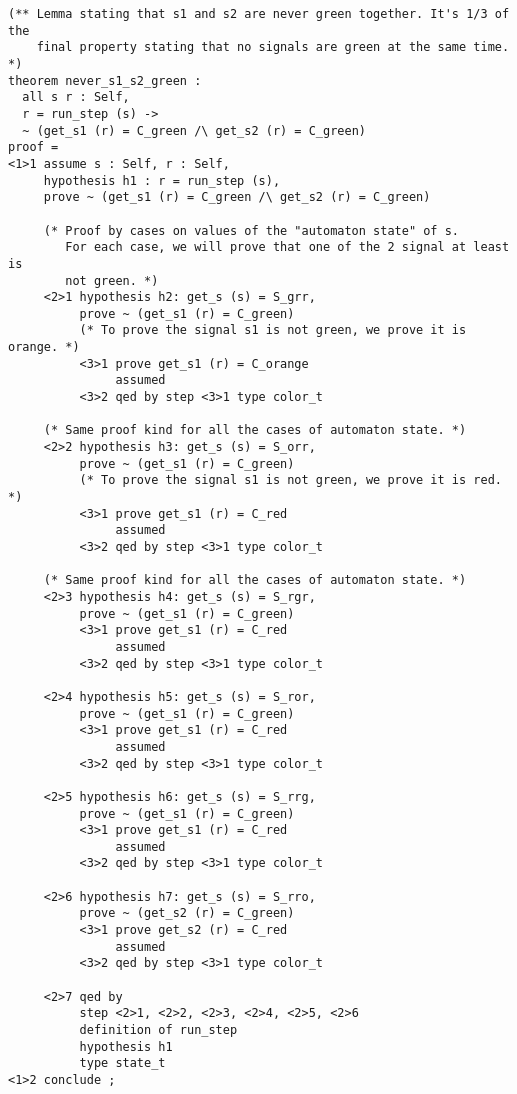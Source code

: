 {\scriptsize
\begin{lstlisting}
(** Lemma stating that s1 and s2 are never green together. It's 1/3 of the
    final property stating that no signals are green at the same time. *)
theorem never_s1_s2_green :
  all s r : Self,
  r = run_step (s) ->
  ~ (get_s1 (r) = C_green /\ get_s2 (r) = C_green)
proof =
<1>1 assume s : Self, r : Self,
     hypothesis h1 : r = run_step (s),
     prove ~ (get_s1 (r) = C_green /\ get_s2 (r) = C_green)

     (* Proof by cases on values of the "automaton state" of s.
        For each case, we will prove that one of the 2 signal at least is
        not green. *)
     <2>1 hypothesis h2: get_s (s) = S_grr,
          prove ~ (get_s1 (r) = C_green)
          (* To prove the signal s1 is not green, we prove it is orange. *)
          <3>1 prove get_s1 (r) = C_orange
               assumed
          <3>2 qed by step <3>1 type color_t

     (* Same proof kind for all the cases of automaton state. *)
     <2>2 hypothesis h3: get_s (s) = S_orr,
          prove ~ (get_s1 (r) = C_green)
          (* To prove the signal s1 is not green, we prove it is red. *)
          <3>1 prove get_s1 (r) = C_red
               assumed
          <3>2 qed by step <3>1 type color_t

     (* Same proof kind for all the cases of automaton state. *)
     <2>3 hypothesis h4: get_s (s) = S_rgr,
          prove ~ (get_s1 (r) = C_green)
          <3>1 prove get_s1 (r) = C_red
               assumed
          <3>2 qed by step <3>1 type color_t

     <2>4 hypothesis h5: get_s (s) = S_ror,
          prove ~ (get_s1 (r) = C_green)
          <3>1 prove get_s1 (r) = C_red
               assumed
          <3>2 qed by step <3>1 type color_t

     <2>5 hypothesis h6: get_s (s) = S_rrg,
          prove ~ (get_s1 (r) = C_green)
          <3>1 prove get_s1 (r) = C_red
               assumed
          <3>2 qed by step <3>1 type color_t

     <2>6 hypothesis h7: get_s (s) = S_rro,
          prove ~ (get_s2 (r) = C_green)
          <3>1 prove get_s2 (r) = C_red
               assumed
          <3>2 qed by step <3>1 type color_t

     <2>7 qed by
          step <2>1, <2>2, <2>3, <2>4, <2>5, <2>6
          definition of run_step
          hypothesis h1
          type state_t
<1>2 conclude ;
\end{lstlisting}}

